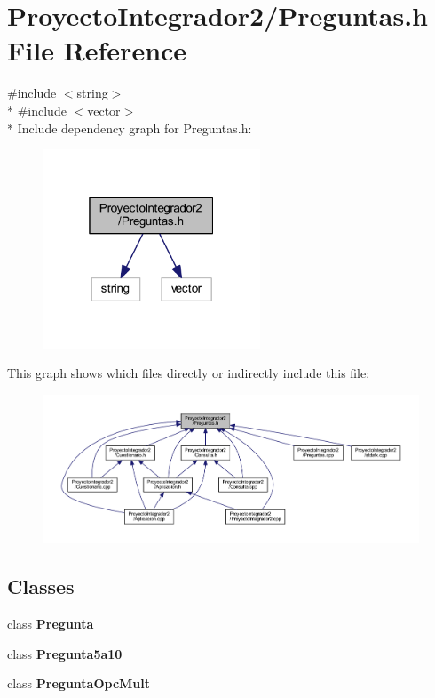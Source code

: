 \section{Proyecto\-Integrador2/\-Preguntas.h File Reference}
\label{_preguntas_8h}
{\ttfamily \#include $<$string$>$}\\*
{\ttfamily \#include $<$vector$>$}\\*
Include dependency graph for Preguntas.\-h\-:\nopagebreak
\begin{figure}[H]
\begin{center}
\leavevmode
\includegraphics[width=184pt]{_preguntas_8h__incl}
\end{center}
\end{figure}
This graph shows which files directly or indirectly include this file\-:\nopagebreak
\begin{figure}[H]
\begin{center}
\leavevmode
\includegraphics[width=350pt]{_preguntas_8h__dep__incl}
\end{center}
\end{figure}
\subsection*{Classes}
\begin{DoxyCompactItemize}
\item 
class {\bf Pregunta}
\item 
class {\bf Pregunta5a10}
\item 
class {\bf Pregunta\-Opc\-Mult}
\end{DoxyCompactItemize}
